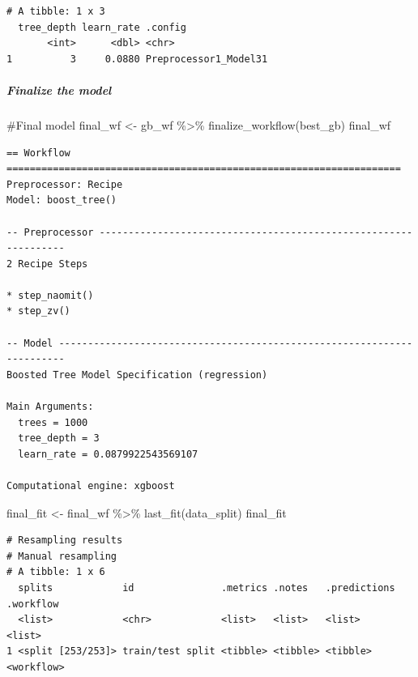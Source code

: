 \documentclass[
]{article}
\let\oldsubparagraph\subparagraph
\renewcommand{\subparagraph}[1]{\oldsubparagraph{#1}\mbox{}}
\newenvironment{Shaded}{\begin{snugshade}}{\end{snugshade}}
\newcommand{\CommentTok}[1]{\textcolor[rgb]{0.37,0.37,0.37}{#1}}
\newcommand{\FunctionTok}[1]{\textcolor[rgb]{0.28,0.35,0.67}{#1}}
\newcommand{\NormalTok}[1]{\textcolor[rgb]{0.00,0.23,0.31}{#1}}
\newcommand{\OtherTok}[1]{\textcolor[rgb]{0.00,0.23,0.31}{#1}}
\newcommand{\SpecialCharTok}[1]{\textcolor[rgb]{0.37,0.37,0.37}{#1}}
\begin{document}
\begin{verbatim}
# A tibble: 1 x 3
  tree_depth learn_rate .config              
       <int>      <dbl> <chr>                
1          3     0.0880 Preprocessor1_Model31
\end{verbatim}

\hypertarget{finalize-the-model-1}{%
\subparagraph{Finalize the model}\label{finalize-the-model-1}}

\begin{Shaded}
\begin{Highlighting}[]
\CommentTok{\#Final model}
\NormalTok{final\_wf }\OtherTok{\textless{}{-}}\NormalTok{ gb\_wf }\SpecialCharTok{\%\textgreater{}\%}
  \FunctionTok{finalize\_workflow}\NormalTok{(best\_gb)}
\NormalTok{final\_wf}
\end{Highlighting}
\end{Shaded}

\begin{verbatim}
== Workflow ====================================================================
Preprocessor: Recipe
Model: boost_tree()

-- Preprocessor ----------------------------------------------------------------
2 Recipe Steps

* step_naomit()
* step_zv()

-- Model -----------------------------------------------------------------------
Boosted Tree Model Specification (regression)

Main Arguments:
  trees = 1000
  tree_depth = 3
  learn_rate = 0.0879922543569107

Computational engine: xgboost 
\end{verbatim}

\begin{Shaded}
\begin{Highlighting}[]
\NormalTok{final\_fit }\OtherTok{\textless{}{-}} 
\NormalTok{  final\_wf }\SpecialCharTok{\%\textgreater{}\%}
  \FunctionTok{last\_fit}\NormalTok{(data\_split)}
\NormalTok{final\_fit}
\end{Highlighting}
\end{Shaded}

\begin{verbatim}
# Resampling results
# Manual resampling 
# A tibble: 1 x 6
  splits            id               .metrics .notes   .predictions .workflow 
  <list>            <chr>            <list>   <list>   <list>       <list>    
1 <split [253/253]> train/test split <tibble> <tibble> <tibble>     <workflow>
\end{verbatim}
\end{document}
